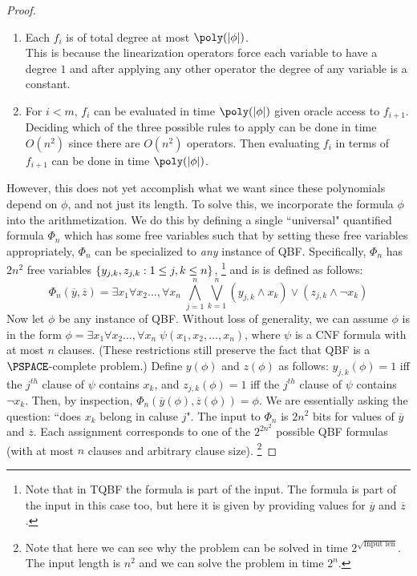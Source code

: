 \begin{proof}
\begin{enumerate}
	\item Each $f_i$ is of total degree at most $\poly(\card{\phi})$. \\
	This is because the linearization operators force each variable to have a degree $1$ and after applying any other operator the degree of any variable is a constant.
	
	\item For $i < m$, $f_i$ can be evaluated in time $\poly(\card{\phi})$ given oracle access to $f_{i+1}$. \\
	Deciding which of the three possible rules to apply can be done in time $O(n^2)$ since there are $O(n^2)$ operators. Then evaluating $f_i$ in terms of $f_{i+1}$ can be done in time $\poly(\card{\phi})$.
\end{enumerate}

However, this does not yet accomplish what we want since these polynomials depend on $\phi$, and not just its length. To solve this, we incorporate the formula $\phi$ into the arithmetization. We do this by defining a single ``universal" quantified formula $\Phi_n$ which has some free variables such that by setting these free variables appropriately, $\Phi_n$ can be specialized to \emph{any} instance of QBF. Specifically, $\Phi_n$ has $2n^2$ free variables $\{y_{j,k}, z_{j,k} : 1 \leq j, k \leq n\}$, \footnote{Note that in TQBF the formula is part of the input. The formula is part of the input in this case too, but here it is given by providing values for $\overline{y}$ and $\overline{z}$. }
and is is defined as follows:
\[
	\Phi_n(\overline{y}, \overline{z}) = \exists x_1 \forall x_2 \ldots , \forall x_n \; \bigwedge_{j=1}^n \bigvee_{k=1}^n (y_{j,k} \wedge x_k) \vee (z_{j,k} \wedge \neg x_k)
\]
Now let $\phi$ be any instance of QBF. Without loss of generality, we can assume $\phi$ is in the form $\phi = \exists x_1 \forall x_2 \ldots , \forall x_n \; \psi(x_1,x_2, \ldots, x_n)$, where $\psi$ is a CNF formula with at most $n$ clauses. (These restrictions still preserve the fact that QBF is a $\PSPACE$-complete problem.)
Define $y(\phi)$ and $z(\phi)$ as follows: $y_{j,k}(\phi) = 1$ iff the $j^{th}$ clause of $\psi$ contains $x_k$, and $z_{j,k}(\phi) = 1$ iff the $j^{th}$ clause of $\psi$ contains $\neg x_k$. Then, by inspection, $\Phi_n(\overline{y}(\phi), \overline{z}(\phi)) = \phi$.
We are essentially asking the question: ``does $x_k$ belong in caluse $j$". The input to $\Phi_n$ is $2n^2$ bits for values of $\overline{y}$ and $\overline{z}$. Each assignment corresponds to one of the $2^{2n^2}$ possible QBF formulas (with at most $n$ clauses and arbitrary clause size). \footnote{Note that here we can see why the problem can be solved in time $2^{\sqrt{\text{Input len}}}$. The input length is $n^2$ and we can solve the problem in time $2^n$.}



\end{proof}
